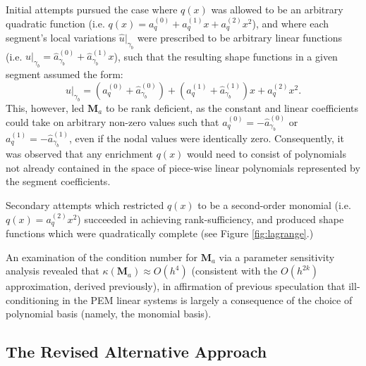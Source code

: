 \documentclass[12pt]{article}
\begin{document}
Initial attempts pursued the case where $q(x)$ was allowed to be an arbitrary quadratic function (i.e. $q(x) = a_q^{(0)} + a_q^{(1)} x + a_q^{(2)} x^2$), and where each segment's local variations $\hat{u} |_{\gamma_b}$ were prescribed to be arbitrary linear functions (i.e. $\hat{u} |_{\gamma_b} = \hat{a}_{\gamma_b}^{(0)} + \hat{a}_{\gamma_b}^{(1)} x$), such that the resulting shape functions in a given segment assumed the form:
\begin{equation}
	u |_{\gamma_b} = (a_q^{(0)} + \hat{a}_{\gamma_b}^{(0)}) + (a_q^{(1)} + \hat{a}_{\gamma_b}^{(1)}) x + a_q^{(2)} x^2.
\end{equation}
This, however, led $\mathbf{M}_a$ to be rank deficient, as the constant and linear coefficients could take on arbitrary non-zero values such that $a_q^{(0)} = - \hat{a}_{\gamma_b}^{(0)}$ or $a_q^{(1)} = - \hat{a}_{\gamma_b}^{(1)}$, even if the nodal values were identically zero. Consequently, it was observed that any enrichment $q(x)$ would need to consist of polynomials not already contained in the space of piece-wise linear polynomials represented by the segment coefficients. 


Secondary attempts which restricted $q(x)$ to be a second-order monomial (i.e. $q(x) = a_q^{(2)} x^2$) succeeded in achieving rank-sufficiency, and produced shape functions which were quadratically complete (see Figure \ref{fig:lagrange}.)


An examination of the condition number for $\mathbf{M}_a$ via a parameter sensitivity analysis revealed that $\kappa (\mathbf{M}_a) \approx O (h^4)$ (consistent with the $O (h^{2k})$ approximation, derived previously), in affirmation of previous speculation that ill-conditioning in the PEM linear systems is largely a consequence of the choice of polynomial basis (namely, the monomial basis).

\newpage

\subsection*{The Revised Alternative Approach}
\end{document}
